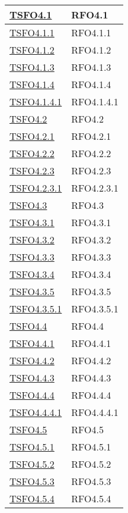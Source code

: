 \begin{longtable}{|>{\centering}m{5cm}|m{5cm}<{\centering}|}
\hyperlink{TSFO4.1}{TSFO4.1} & RFO4.1\\ \hline
\hyperlink{TSFO4.1.1}{TSFO4.1.1} & RFO4.1.1\\ \hline
\hyperlink{TSFO4.1.2}{TSFO4.1.2} & RFO4.1.2\\ \hline
\hyperlink{TSFO4.1.3}{TSFO4.1.3} & RFO4.1.3\\ \hline
\hyperlink{TSFO4.1.4}{TSFO4.1.4} & RFO4.1.4\\ \hline
\hyperlink{TSFO4.1.4.1}{TSFO4.1.4.1} & RFO4.1.4.1\\ \hline
\hyperlink{TSFO4.2}{TSFO4.2} & RFO4.2\\ \hline
\hyperlink{TSFO4.2.1}{TSFO4.2.1} & RFO4.2.1\\ \hline
\hyperlink{TSFO4.2.2}{TSFO4.2.2} & RFO4.2.2\\ \hline
\hyperlink{TSFO4.2.3}{TSFO4.2.3} & RFO4.2.3\\ \hline
\hyperlink{TSFO4.2.3.1}{TSFO4.2.3.1} & RFO4.2.3.1\\ \hline
\hyperlink{TSFO4.3}{TSFO4.3} & RFO4.3\\ \hline
\hyperlink{TSFO4.3.1}{TSFO4.3.1} & RFO4.3.1\\ \hline
\hyperlink{TSFO4.3.2}{TSFO4.3.2} & RFO4.3.2\\ \hline
\hyperlink{TSFO4.3.3}{TSFO4.3.3} & RFO4.3.3\\ \hline
\hyperlink{TSFO4.3.4}{TSFO4.3.4} & RFO4.3.4\\ \hline
\hyperlink{TSFO4.3.5}{TSFO4.3.5} & RFO4.3.5\\ \hline
\hyperlink{TSFO4.3.5.1}{TSFO4.3.5.1} & RFO4.3.5.1\\ \hline
\hyperlink{TSFO4.4}{TSFO4.4} & RFO4.4\\ \hline
\hyperlink{TSFO4.4.1}{TSFO4.4.1} & RFO4.4.1\\ \hline
\hyperlink{TSFO4.4.2}{TSFO4.4.2} & RFO4.4.2\\ \hline
\hyperlink{TSFO4.4.3}{TSFO4.4.3} & RFO4.4.3\\ \hline
\hyperlink{TSFO4.4.4}{TSFO4.4.4} & RFO4.4.4\\ \hline
\hyperlink{TSFO4.4.4.1}{TSFO4.4.4.1} & RFO4.4.4.1\\ \hline
\hyperlink{TSFO4.5}{TSFO4.5} & RFO4.5\\ \hline
\hyperlink{TSFO4.5.1}{TSFO4.5.1} & RFO4.5.1\\ \hline
\hyperlink{TSFO4.5.2}{TSFO4.5.2} & RFO4.5.2\\ \hline
\hyperlink{TSFO4.5.3}{TSFO4.5.3} & RFO4.5.3\\ \hline
\hyperlink{TSFO4.5.4}{TSFO4.5.4} & RFO4.5.4\\ \hline

\end{longtable}
